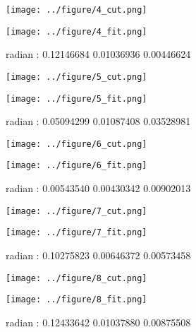 \documentclass{article}
\begin{document}
\begin{figure}[H]
\begin{minipage}{0.48\linewidth}
  \centerline{\texttt{[image: ../figure/4\_cut.png]}}
\end{minipage}
\hfill
\begin{minipage}{0.48\linewidth}
  \centerline{\texttt{[image: ../figure/4\_fit.png]}}
\end{minipage}
\caption{radian : 0.12146684 0.01036936 0.00446624}
\end{figure}

 \begin{figure}[H]
\begin{minipage}{0.48\linewidth}
  \centerline{\texttt{[image: ../figure/5\_cut.png]}}
\end{minipage}
\hfill
\begin{minipage}{0.48\linewidth}
  \centerline{\texttt{[image: ../figure/5\_fit.png]}}
\end{minipage}
\caption{radian : 0.05094299 0.01087408 0.03528981}
\end{figure}

\begin{figure}[H]
\begin{minipage}{0.48\linewidth}
  \centerline{\texttt{[image: ../figure/6\_cut.png]}}
\end{minipage}
\hfill
\begin{minipage}{0.48\linewidth}
  \centerline{\texttt{[image: ../figure/6\_fit.png]}}
\end{minipage}
\caption{radian : 0.00543540 0.00430342 0.00902013}
\end{figure}

  \begin{figure}[H]
\begin{minipage}{0.48\linewidth}
  \centerline{\texttt{[image: ../figure/7\_cut.png]}}
\end{minipage}
\hfill
\begin{minipage}{0.48\linewidth}
  \centerline{\texttt{[image: ../figure/7\_fit.png]}}
\end{minipage}
\caption{radian : 0.10275823 0.00646372 0.00573458}
\end{figure}


 \begin{figure}[H]
\begin{minipage}{0.48\linewidth}
  \centerline{\texttt{[image: ../figure/8\_cut.png]}}
\end{minipage}
\hfill
\begin{minipage}{0.48\linewidth}
  \centerline{\texttt{[image: ../figure/8\_fit.png]}}
\end{minipage}
\caption{radian : 0.12433642 0.01037880 0.00875508}
\end{figure}
\end{document}
